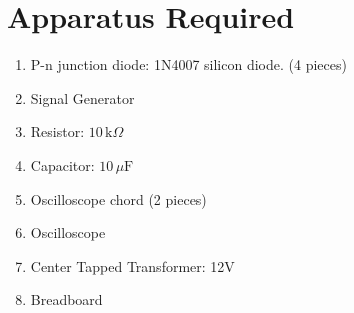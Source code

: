 \section{Apparatus Required}

\begin{enumerate}
  \setlength{\itemsep}{0pt}
        \setlength{\parskip}{0pt}
        \setlength{\parsep}{0pt}
  \item P-n junction diode: 1N4007 silicon diode. (4 pieces)
  \item Signal Generator
  \item Resistor: $10\,\text{k}\Omega$
  \item Capacitor: $10\,\mu\text{F}$
  \item Oscilloscope chord (2 pieces)
  \item Oscilloscope
  \item Center Tapped Transformer: 12V
  \item Breadboard
\end{enumerate}
